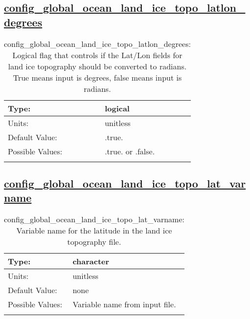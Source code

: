 \subsection[config\_global\_ocean\_land\_ice\_topo\_latlon\_degrees]{\hyperref[sec:nm_tab_global_ocean]{config\_global\_ocean\_land\_ice\_topo\_latlon\_degrees}}
\label{subsec:nm_sec_config_global_ocean_land_ice_topo_latlon_degrees}
\begin{center}
\begin{longtable}{| p{2.0in} || p{4.0in} |}
    \hline
    Type: & logical \\
    \hline
    Units: & \si{unitless} \\
    \hline
    Default Value: & .true. \\
    \hline
    Possible Values: & .true. or .false. \\
    \hline
    \caption{config\_global\_ocean\_land\_ice\_topo\_latlon\_degrees: Logical flag that controls if the Lat/Lon fields for land ice topography should be converted to radians. True means input is degrees, false means input is radians.}
\end{longtable}
\end{center}
\subsection[config\_global\_ocean\_land\_ice\_topo\_lat\_varname]{\hyperref[sec:nm_tab_global_ocean]{config\_global\_ocean\_land\_ice\_topo\_lat\_varname}}
\label{subsec:nm_sec_config_global_ocean_land_ice_topo_lat_varname}
\begin{center}
\begin{longtable}{| p{2.0in} || p{4.0in} |}
    \hline
    Type: & character \\
    \hline
    Units: & \si{unitless} \\
    \hline
    Default Value: & none \\
    \hline
    Possible Values: & Variable name from input file. \\
    \hline
    \caption{config\_global\_ocean\_land\_ice\_topo\_lat\_varname: Variable name for the latitude in the land ice topography file.}
\end{longtable}
\end{center}

